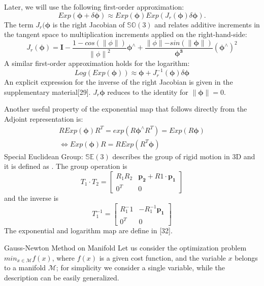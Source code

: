 \documentclass[a4paper]{report}
\begin{document}
Later, we will use the following first-order approximation:
\begin{equation}
Exp(\bm{\phi}+\delta \bm{\phi})\approx Exp(\bm{\phi})Exp(J_r(\bm{\phi}) \delta \bm{\phi}).
\end{equation}
The term $J_r(\bm{\phi}$ is the right Jacobian of $\mathbb{SO}(3)$ and relates additive increments in the tangent space to multiplication increments applied on the right-hand-side:
\begin{equation}
J_r({\bm{\phi}})=\bm{I}-\frac{1-cos(\parallel \phi \parallel)}{{\parallel \phi \parallel}^2}\bm{\phi^{\land}}+\frac{\parallel \phi \parallel - sin(\parallel \bm{\phi} \parallel)}{\bm{\phi^{3}}}(\bm{\phi}^{\land})^2
\end{equation}
A similar first-order approximation holds for the logarithm:
\begin{equation}
Log(Exp(\bm{\phi}))\approx \bm{\phi}+J_r^{-1}(\bm{\phi})\delta \bm{\phi}
\end{equation}
An explicit expression for the inverse of the right Jacobian is given in the supplementary material[29]. $J_r{\bm{\phi}}$ reduces to the identity for $\parallel \bm{\phi} \parallel=0$.

Another useful property of the exponential map that follows directly from the Adjoint representation is:
\begin{eqnarray}
R Exp(\bm{\phi}) R^T = exp(R\bm{\phi}^{\land}R^T)=Exp(R\bm{\phi}) \\ 
\iff Exp(\bm{\phi})R=RExp(R^T\bm{\phi})
\end{eqnarray}
Special Euclidean Group: $\mathbb{SE}(3)$ describes the group of rigid motion in 3D and it is defined as . The group operation is 
$$
T_1 \cdot T_2=
\left[
\begin{matrix}
R_1R_2 & \bm{p_2}+R1\cdot \bm{p_1} \\
0^T & 0
\end{matrix}
\right]
$$
and the inverse is 
$$
T_1^{-1}=\left[
\begin{matrix}
R_1^-1 & -R_1^{-1}\bm{p_1} \\
0^T & 0
\end{matrix}
\right]
$$
The exponential and logarithm map are define in [32]. 




Gauss-Newton Method on Manifold
Let us consider the optimization problem $min_{x \in \mathcal{M}}{f(x)}$, where $f(x)$ is a given cost function, and the variable $x$ belongs to a manifold $\mathcal{M}$; for simplicity we consider a single variable, while the description can be easily generalized.
\end{document}
